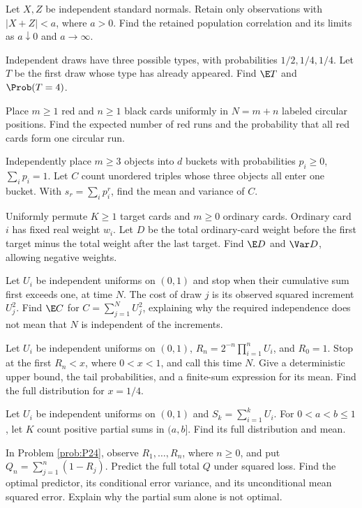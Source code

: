Let $X,Z$ be independent standard normals. Retain only observations with $|X+Z|<a$, where $a>0$. Find the retained population correlation and its limits as $a\downarrow0$ and $a\to\infty$.

Independent draws have three possible types, with probabilities $1/2,1/4,1/4$. Let $T$ be the first draw whose type has already appeared. Find $\E T$ and $\Prob(T=4)$.

Place $m\ge1$ red and $n\ge1$ black cards uniformly in $N=m+n$ labeled circular positions. Find the expected number of red runs and the probability that all red cards form one circular run.

Independently place $m\ge3$ objects into $d$ buckets with probabilities $p_i\ge0$, $\sum_i p_i=1$. Let $C$ count unordered triples whose three objects all enter one bucket. With $s_r=\sum_i p_i^r$, find the mean and variance of $C$.

Uniformly permute $K\ge1$ target cards and $m\ge0$ ordinary cards. Ordinary card $i$ has fixed real weight $w_i$. Let $D$ be the total ordinary-card weight before the first target minus the total weight after the last target. Find $\E D$ and $\Var D$, allowing negative weights.

Let $U_i$ be independent uniforms on $(0,1)$ and stop when their cumulative sum first exceeds one, at time $N$. The cost of draw $j$ is its observed squared increment $U_j^2$. Find $\E C$ for $C=\sum_{j=1}^NU_j^2$, explaining why the required independence does not mean that $N$ is independent of the increments.

Let $U_i$ be independent uniforms on $(0,1)$, $R_n=2^{-n}\prod_{i=1}^nU_i$, and $R_0=1$. Stop at the first $R_n<x$, where $0<x<1$, and call this time $N$. Give a deterministic upper bound, the tail probabilities, and a finite-sum expression for its mean. Find the full distribution for $x=1/4$.

Let $U_i$ be independent uniforms on $(0,1)$ and $S_k=\sum_{i=1}^kU_i$. For $0<a<b\le1$, let $K$ count positive partial sums in $(a,b]$. Find its full distribution and mean.

In Problem \ref{prob:P24}, observe $R_1,\ldots,R_n$, where $n\ge0$, and put $Q_n=\sum_{j=1}^n(1-R_j)$. Predict the full total $Q$ under squared loss. Find the optimal predictor, its conditional error variance, and its unconditional mean squared error. Explain why the partial sum alone is not optimal.

